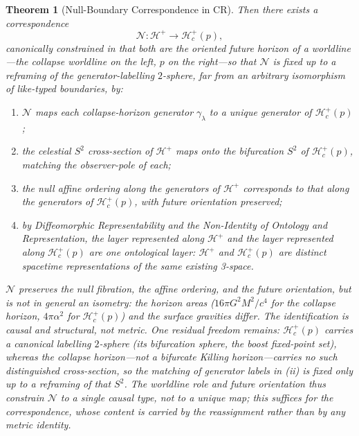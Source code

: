 \documentclass[11pt,a4paper]{article}
\theoremstyle{plain}
\newtheorem{theorem}{Theorem}
\theoremstyle{definition}
\theoremstyle{remark}
\begin{document}
\begin{theorem}[Null-Boundary Correspondence in CR]
Then there exists a correspondence
\[
\mathcal{N}:\mathcal{H}^+ \longrightarrow \mathcal{H}_c^{+}(p),
\]
\emph{canonically constrained} in that both are the oriented future horizon of a worldline---the collapse worldline on the left, $p$ on the right---so that $\mathcal{N}$ is fixed up to a reframing of the generator-labelling $2$-sphere, far from an arbitrary isomorphism of like-typed boundaries, by:
\begin{enumerate}
    \item $\mathcal{N}$ maps each collapse-horizon generator $\gamma_\lambda$ to a unique generator of $\mathcal{H}_c^{+}(p)$;
    \item the celestial $S^2$ cross-section of $\mathcal{H}^+$ maps onto the bifurcation $S^2$ of $\mathcal{H}_c^{+}(p)$, matching the observer-pole of each;
    \item the null affine ordering along the generators of $\mathcal{H}^+$ corresponds to that along the generators of $\mathcal{H}_c^{+}(p)$, with future orientation preserved;
    \item by Diffeomorphic Representability and the Non-Identity of Ontology and Representation, the layer represented along $\mathcal{H}^+$ and the layer represented along $\mathcal{H}_c^{+}(p)$ are one ontological layer: $\mathcal{H}^+$ and $\mathcal{H}_c^{+}(p)$ are distinct spacetime representations of the same existing 3-space.
\end{enumerate}
$\mathcal{N}$ preserves the null fibration, the affine ordering, and the future orientation, but is \emph{not} in general an isometry: the horizon areas ($16\pi G^2M^2/c^4$ for the collapse horizon, $4\pi\alpha^2$ for $\mathcal{H}_c^{+}(p)$) and the surface gravities differ. The identification is causal and structural, not metric. One residual freedom remains: $\mathcal{H}_c^{+}(p)$ carries a canonical labelling $2$-sphere (its bifurcation sphere, the boost fixed-point set), whereas the collapse horizon---not a bifurcate Killing horizon---carries no such distinguished cross-section, so the matching of generator labels in (ii) is fixed only up to a reframing of that $S^2$. The worldline role and future orientation thus constrain $\mathcal{N}$ to a single causal type, not to a unique map; this suffices for the correspondence, whose content is carried by the reassignment rather than by any metric identity.


\end{theorem}
\end{document}
